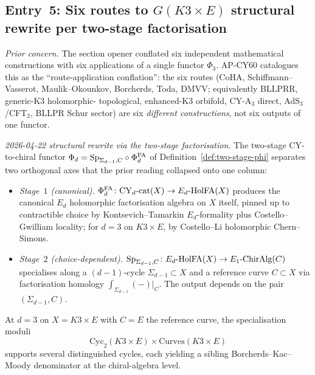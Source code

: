 \subsection*{Entry~5: Six routes to $G(K3 \times E)$ structural rewrite
per two-stage factorisation}
\label{wn:sec:tautology-healing-entry5}

\emph{Prior concern.}  The section opener conflated six independent
mathematical constructions with six applications of a single functor
$\Phi_3$.  AP-CY60 catalogues this as the ``route-application
conflation'': the six routes (CoHA, Schiffmann--Vasserot, Maulik--Okounkov,
Borcherds, Toda, DMVV; equivalently BLLPRR, generic-K3 holomorphic-
topological, enhanced-K3 orbifold, CY-A$_3$ direct, AdS$_3$/CFT$_2$,
BLLPR Schur sector) are six \emph{different constructions}, not six
outputs of one functor.

\emph{2026-04-22 structural rewrite via the two-stage factorisation.}
The two-stage CY-to-chiral functor $\Phi_d = \mathrm{Sp}_{\Sigma_{d-1},
C} \circ \Phi^{\mathrm{FA}}_d$ of Definition~\ref{def:two-stage-phi} separates two
orthogonal axes that the prior reading collapsed onto one column:
\begin{itemize}
 \item \emph{Stage~$1$ (canonical).}  $\Phi^{\mathrm{FA}}_d \colon
  \mathrm{CY}_d\text{-cat}(X) \to E_d\text{-HolFA}(X)$ produces the canonical
  $E_d$ holomorphic factorisation algebra on $X$ itself, pinned up to
  contractible choice by Kontsevich--Tamarkin $E_d$-formality plus
  Costello--Gwilliam locality; for $d = 3$ on $K3 \times E$, by
  Costello--Li holomorphic Chern--Simons.
 \item \emph{Stage~$2$ (choice-dependent).}  $\mathrm{Sp}_{\Sigma_{d-1},
  C} \colon E_d\text{-HolFA}(X) \to E_1\text{-ChirAlg}(C)$ specialises
  along a $(d - 1)$-cycle $\Sigma_{d - 1} \subset X$ and a reference
  curve $C \subset X$ via factorisation homology
  $\int_{\Sigma_{d - 1}}(-)|_C$.  The output depends on the pair
  $(\Sigma_{d - 1}, C)$.
\end{itemize}
At $d = 3$ on $X = K3 \times E$ with $C = E$ the reference curve, the
specialisation moduli
\[
\mathrm{Cyc}_2(K3 \times E) \times \mathrm{Curves}(K3 \times E)
\]
supports several distinguished cycles, each yielding a sibling
Borcherds--Kac--Moody denominator at the chiral-algebra level.

